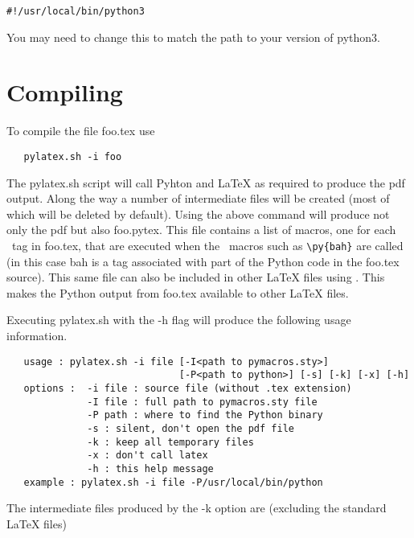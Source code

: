 \documentclass[12pt]{article}
\begin{document}
\begin{lstlisting}
#!/usr/local/bin/python3
\end{lstlisting}

You may need to change this to match the path to your version of {\tts python3}.

\section{Compiling}
To compile the file {\tts foo.tex} use

\begin{lstlisting}
   pylatex.sh -i foo
\end{lstlisting}

The {\tts pylatex.sh} script will call Pyhton and LaTeX as required to produce the
pdf output. Along the way a number of intermediate files will be created (most of
which will be deleted by default). Using the above command will produce not only
the pdf but also {\tts foo.pytex}. This file contains a list of macros, one for
each \pyLaTeX\ tag in {\tts foo.tex}, that are executed when the \pyLaTeX\ macros
such as {\tts\verb|\py{bah}|} are called (in this case {\tts bah} is a tag
associated with part of the Python code in the {\tts foo.tex} source). This same
file can also be included in other LaTeX files using
{\tts\verb||}. This makes the Python output from {\tts foo.tex}
available to other LaTeX files.

Executing {\tts pylatex.sh} with the {\tts -h} flag will produce the following
usage information.

\begin{lstlisting}
   usage : pylatex.sh -i file [-I<path to pymacros.sty>]
                              [-P<path to python>] [-s] [-k] [-x] [-h]
   options :  -i file : source file (without .tex extension)
              -I file : full path to pymacros.sty file
              -P path : where to find the Python binary
              -s : silent, don't open the pdf file
              -k : keep all temporary files
              -x : don't call latex
              -h : this help message
   example : pylatex.sh -i file -P/usr/local/bin/python
\end{lstlisting}

The intermediate files produced by the {\tts -k} option are (excluding the
standard LaTeX files)
\end{document}
